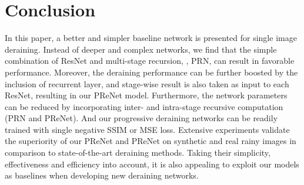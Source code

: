\documentclass[10pt,twocolumn,letterpaper]{article}
\begin{document}
\section{Conclusion}

In this paper, a better and simpler baseline network is presented for single image deraining.
Instead of deeper and complex networks, we find that the simple combination of ResNet and multi-stage recursion, \ie, PRN, can result in favorable performance.
Moreover, the deraining performance can be further boosted by the inclusion of recurrent layer, and stage-wise result is also taken as input to each ResNet, resulting in our PReNet model.
Furthermore, the network parameters can be reduced by incorporating inter- and intra-stage recursive computation (PRN and PReNet).
And our progressive deraining networks can be readily trained with single negative SSIM or MSE loss.
Extensive experiments validate the superiority of our PReNet and PReNet on synthetic and real rainy images in comparison to state-of-the-art deraining methods.
Taking their simplicity, effectiveness and efficiency into account, it is also appealing to
exploit our models as baselines when developing new deraining networks.








{\small


}
\end{document}
